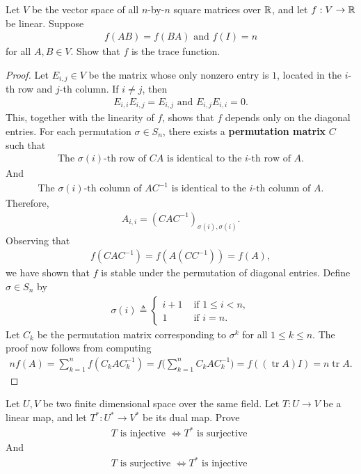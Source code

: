 \documentclass{report}
\begin{document}
\begin{question}{}{}
Let $V$ be the vector space of all $n$-by-$n$ square matrices over $\mathbb{R}$, and let $f:V\rightarrow \mathbb{R}$ be linear. Suppose  
\begin{align*}
f(AB)=f(BA)\text{ and }f(I)=n
\end{align*}
for all $A,B \in V$. Show that $f$ is the trace function. 
\end{question}
\begin{proof}
Let $E_{i,j}\in V$ be the matrix whose only nonzero entry is $1$, located in the $i$-th row and $j$-th column. If $i \neq j$, then  
\begin{align*}
E_{i,i}E_{i,j}=E_{i,j}\text{ and }E_{i,j}E_{i,i}=0.
\end{align*}
This, together with the linearity of $f$, shows that $f$ depends only on the diagonal entries. For each permutation $\sigma \in S_n$, there exists a \textbf{permutation matrix} $C$ such that  
\begin{align*}
\text{The $\sigma(i)$-th row of }CA\text{ is identical to the $i$-th row of }A.
\end{align*}
And  
\begin{align*}
\text{The $\sigma(i)$-th column of }AC^{-1}\text{ is identical to the $i$-th column of }A.
\end{align*}
Therefore,  
\begin{align*}
  A_{i,i}=(CAC^{-1})_{\sigma (i),\sigma (i)}.
\end{align*}
Observing that  
\begin{align*}
f(CAC^{-1})=f(A(CC^{-1}))=f(A),
\end{align*}
we have shown that $f$ is stable under the permutation of diagonal entries. Define $\sigma \in S_n$ by  
\begin{align*}
\sigma(i)\triangleq \begin{cases}
  i+1& \text{ if } 1\leq i<n, \\
  1& \text{ if } i=n.
\end{cases}
\end{align*}
Let $C_k$ be the permutation matrix corresponding to $\sigma^k$ for all $1\leq k\leq n$. The proof now follows from computing  
\begin{align*}
nf(A)= \sum_{k=1}^{n}f(C_kAC_k^{-1})=f\Big(\sum_{k=1}^n C_kAC_k^{-1}\Big)= f((\operatorname{tr}A)I)=n\operatorname{tr}A.
\end{align*}
\end{proof}
\begin{question}{}{}
  Let $U,V$ be two finite dimensional space over the same field. Let  $T:U\rightarrow V$ be a linear map, and let $T^*:U^*\rightarrow V^*$ be its dual map. Prove 
\begin{align*}
T\text{ is injective }\iff T^*\text{ is surjective }   
\end{align*}
And 
\begin{align*}
T\text{ is surjective }\iff T^*\text{ is injective }
\end{align*}
\end{question}
\end{document}
